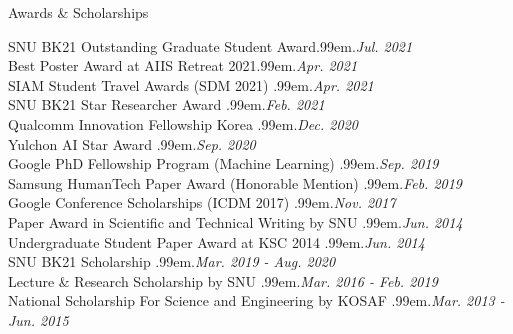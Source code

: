 \documentclass{resume} %
\makeatletter
\newcommand \Dotfill {\leavevmode \cleaders \hb@xt@ .99em{\hss .\hss }\hfill \kern \z@}
\makeatother
\begin{document}
\begin{rSection}{Awards \& Scholarships}

SNU BK21 Outstanding Graduate Student Award\smallskip \Dotfill \emph{Jul. 2021} \\ 
Best Poster Award at AIIS Retreat 2021\smallskip \Dotfill \emph{Apr. 2021} \\ 
SIAM Student Travel Awards (SDM 2021) \smallskip \Dotfill \emph{Apr. 2021} \\ 
SNU BK21 Star Researcher Award \smallskip \Dotfill \emph{Feb. 2021} \\ 
Qualcomm Innovation Fellowship Korea \smallskip \Dotfill \emph{Dec. 2020} \\ 
Yulchon AI Star Award \smallskip \Dotfill \emph{Sep. 2020} \\ 
Google PhD Fellowship Program (Machine Learning) \smallskip \Dotfill \emph{Sep. 2019} \\ 
Samsung HumanTech Paper Award (Honorable Mention) \smallskip \Dotfill \emph{Feb. 2019} \\ 
Google Conference Scholarships (ICDM 2017) \smallskip \Dotfill \emph{Nov. 2017} \\ 
Paper Award in Scientific and Technical Writing by SNU \smallskip \Dotfill \emph{Jun. 2014} \\ 
Undergraduate Student Paper Award at KSC 2014 \smallskip \Dotfill \emph{Jun. 2014} \\
SNU BK21 Scholarship \smallskip \Dotfill \emph{Mar. 2019 - Aug. 2020} \\ 
Lecture \& Research Scholarship by SNU \smallskip \Dotfill \emph{Mar. 2016 - Feb. 2019} \\
National Scholarship For Science and Engineering by KOSAF \smallskip \Dotfill \emph{Mar. 2013 - Jun. 2015}

\end{rSection}

\end{document}
